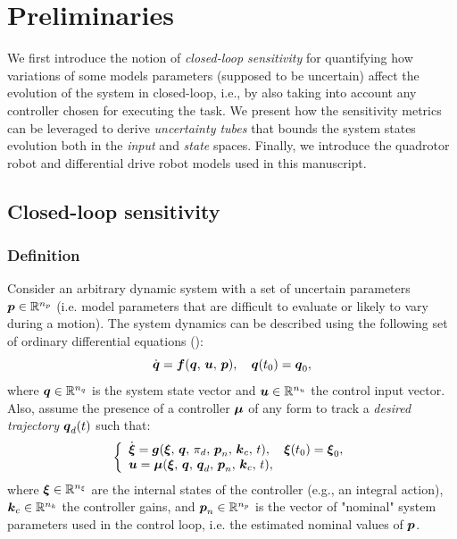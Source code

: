 \chapter{Preliminaries}

We first introduce the notion of \emph{closed-loop sensitivity} for quantifying how variations of some models parameters (supposed to be uncertain) affect the evolution of the system in closed-loop, i.e., by also taking into account any controller chosen for executing the task.
We present how the sensitivity metrics can be leveraged to derive \emph{uncertainty tubes} that bounds the system states evolution both in the \emph{input} and \emph{state} spaces.
Finally, we introduce the quadrotor robot and differential drive robot models used in this manuscript.

\section{Closed-loop sensitivity}
\subsection{Definition}

Consider an arbitrary dynamic system with a set of uncertain parameters $\boldsymbol{p} \in \mathbb{R}^{n_p}$ (i.e. model parameters that are difficult to evaluate or likely to vary during a motion).
The system dynamics can be described using the following set of ordinary differential equations ():
\begin{equation}\label{eq:dyna}
    \dot{\boldsymbol{q}}=\boldsymbol{f}(\boldsymbol{q},\,\boldsymbol{u},\,\boldsymbol{p}), \quad \boldsymbol{q}(t_0)=\boldsymbol{q}_{0},
\end{equation}
where $\boldsymbol{q}\in \mathbb{R}^{n_{q}}$ is the system state vector and $\boldsymbol{u}\in \mathbb{R}^{n_{u}}$ the control input vector.
Also, assume the presence of a controller $\boldsymbol{\mu}$ of any form to track a \emph{desired trajectory} $\boldsymbol{q}_d(t)$ such that:
\begin{equation}\label{eq:ctrl}
     \left \{
     \begin{array}{l l}
          \dot{\boldsymbol{\xi}} = \boldsymbol{g}(\boldsymbol{\xi},\,\boldsymbol{q},\,\pi_d,\,\boldsymbol{p}_n,\,\boldsymbol{k}_c,\,t), \quad \boldsymbol{\xi}(t_0)=\boldsymbol{\xi}_{0}, \\
          \boldsymbol{u}=\boldsymbol{\mu}(\boldsymbol{\xi},\,\boldsymbol{q},\,\boldsymbol{q}_d,\,\boldsymbol{p}_n,\,\boldsymbol{k}_c,\,t), 
   \end{array} 
   \right .
\end{equation}
where $\boldsymbol{\xi}\in \mathbb{R}^{n_{\xi}}$ are the internal states of the controller (e.g., an integral action), $\boldsymbol{k}_{c}\in \mathbb{R}^{n_{k}}$ the controller gains, and $\boldsymbol{p}_{n}\in{\mathbb{R}^{n_{p}}}$ is the vector of "nominal" system parameters used in the control loop, i.e. the estimated nominal values of $\boldsymbol{p}$.

